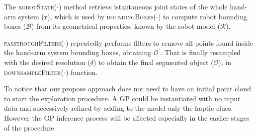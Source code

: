 
The \textsc{robotState}($\cdot$) method retrievs istantaneous joint states
of the whole hand-arm system ($\mathbf{r}$), which is used by \textsc{boundingBoxes($\cdot$)} to compute robot bounding boxes ($\mathcal{B}$)
from its geometrical properties, known by the robot model ($\mathcal{R}$).

\textsc{passtroughFilters}($\cdot$) repeatedly performs filters to remove
all points found inside the hand-arm system bounding boxes, obtaining $\mathcal{O^\prime}$.
That is finally resampled with the desired resolution ($\delta$) 
to obtain the final segmented object ($\mathcal{O}$), in \textsc{downsampleFilter}($\cdot$) function.


To notice that our propose approach does not need to have an initial point cloud to start the exploration procedure. A GP could be instantiated with no input data and successively refined by adding to the model only the haptic clues. However the GP inference process will be affected especially in the earlier stages of the procedure.   

